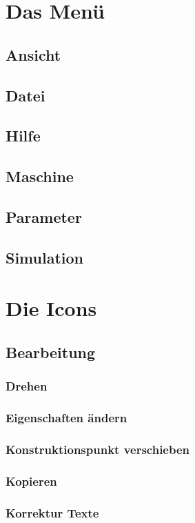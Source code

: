 \documentclass[a5paper]{book}
\begin{document}
	\section{Das Menü}
		\subsection{Ansicht}
		\subsection{Datei}
		\subsection{Hilfe}
		\subsection{Maschine}
		\subsection{Parameter}
		\subsection{Simulation}
	\section{Die Icons}
		\subsection{Bearbeitung}
			\subsubsection{Drehen}
			\subsubsection{Eigenschaften ändern}
			\subsubsection{Konstruktionspunkt verschieben}
			\subsubsection{Kopieren}
			\subsubsection{Korrektur Texte}
\end{document}
